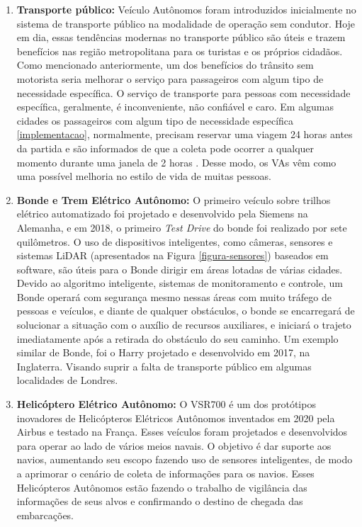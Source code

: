 \begin{enumerate}
 \item \textbf{Transporte público:} Veículo Autônomos foram introduzidos inicialmente no sistema de transporte público na modalidade de operação sem condutor. Hoje em dia, essas tendências modernas no transporte público são úteis e trazem benefícios nas região metropolitana para os turistas e os próprios cidadãos. Como mencionado anteriormente, um dos benefícios do trânsito sem motorista seria melhorar o serviço para passageiros com algum tipo de necessidade específica. O serviço de transporte para pessoas com necessidade específica, geralmente, é inconveniente, não confiável e caro. Em algumas cidades os passageiros com algum tipo de necessidade específica \ref{implementacao}, normalmente, precisam reservar uma viagem 24 horas antes da partida e são informados de que a coleta pode ocorrer a qualquer momento durante uma janela de 2 horas \cite{notif}. Desse modo, os VAs vêm como uma possível melhoria no estilo de vida de muitas pessoas.
\item \textbf{Bonde e Trem Elétrico Autônomo:} O primeiro veículo sobre trilhos elétrico automatizado foi projetado e desenvolvido pela Siemens na Alemanha, e em 2018, o primeiro \textit{Test Drive} do bonde foi realizado por sete quilômetros. O uso de dispositivos inteligentes, como câmeras, sensores e sistemas LiDAR (apresentados na Figura \ref{figura-sensores}) baseados em software, são úteis para o Bonde dirigir em áreas lotadas de várias cidades. Devido ao algoritmo inteligente, sistemas de monitoramento e controle, um Bonde operará com segurança mesmo nessas áreas com muito tráfego de pessoas e veículos, e diante de qualquer obstáculos, o bonde se encarregará de solucionar a situação com o auxílio de recursos auxiliares, e iniciará o trajeto imediatamente após a retirada do obstáculo do seu caminho. Um exemplo similar de Bonde, foi o Harry projetado e desenvolvido em 2017, na Inglaterra. Visando suprir a falta de transporte público em algumas localidades de Londres.
\item \textbf{Helicóptero Elétrico Autônomo:} O VSR700 é um dos protótipos inovadores de Helicópteros Elétricos Autônomos inventados em 2020 pela Airbus e testado na França. Esses veículos foram projetados e desenvolvidos para operar ao lado de vários meios navais. O objetivo é dar suporte aos navios, aumentando seu escopo fazendo uso de sensores inteligentes, de modo a aprimorar o cenário de coleta de informações para os navios. Esses Helicópteros Autônomos estão fazendo o trabalho de vigilância das informações de seus alvos e confirmando o destino de chegada das embarcações. 

\end{enumerate}
